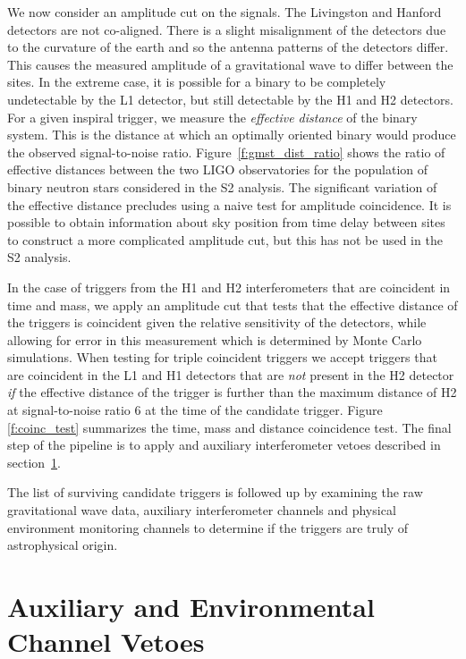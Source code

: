 We now consider an amplitude cut on the signals. The Livingston and Hanford
detectors are not co-aligned. There is a slight misalignment of the detectors
due to the curvature of the earth and so the antenna patterns of the detectors
differ. This causes the measured amplitude of a gravitational wave to differ
between the sites. In the extreme case, it is possible for a binary to be
completely undetectable by the L1 detector, but still detectable by the H1 and
H2 detectors. For a given inspiral trigger, we measure the \emph{effective
distance} of the binary system. This is the distance at which an optimally
oriented binary would produce the observed signal-to-noise ratio.
Figure~\ref{f:gmst_dist_ratio} shows the ratio of effective distances between
the two LIGO observatories for the population of binary neutron stars
considered in the S2 analysis. The significant variation of the effective
distance precludes using a naive test for amplitude coincidence. It is
possible to obtain information about sky position from time delay between
sites to construct a more complicated amplitude cut, but this has not be used
in the S2 analysis.

In the case of triggers from the H1 and H2 interferometers that are coincident
in time and mass, we apply an amplitude cut that tests that the effective
distance of the triggers is coincident given the relative sensitivity of the
detectors, while allowing for error in this measurement which is determined by
Monte Carlo simulations.  When testing for triple coincident triggers we 
accept triggers that are coincident in the L1 and H1 detectors that are
\emph{not} present in the H2 detector \emph{if} the effective distance of the
trigger is further than the maximum distance of H2 at signal-to-noise ratio
$6$ at the time of the candidate trigger. Figure \ref{f:coinc_test} summarizes
the time, mass and distance coincidence test.  The final step of the pipeline
is to apply and auxiliary interferometer vetoes described in
section~\ref{s:vetoes}. 

The list of surviving candidate triggers is followed up by examining the raw
gravitational wave data, auxiliary interferometer channels and physical
environment monitoring channels to determine if the triggers are truly of
astrophysical origin.


\section{Auxiliary and Environmental Channel Vetoes}
\label{s:vetoes}

